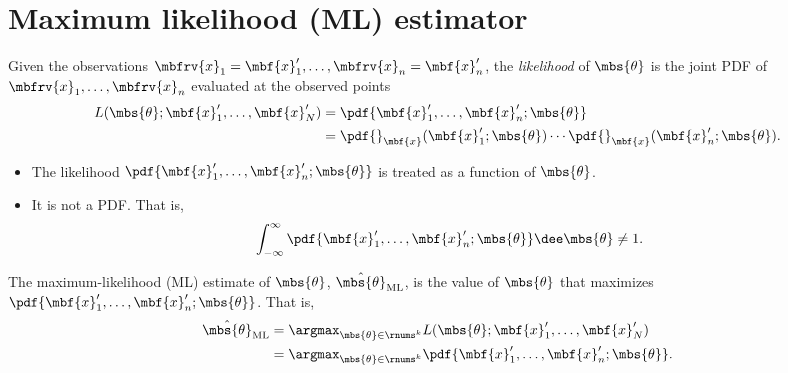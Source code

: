 \section{Maximum likelihood (ML) estimator}
\begin{mydefinition}[Likelihood]
    Given the observations $\mbfrv{x}_{1} = \mbf{x}_{1}', \ldots, \mbfrv{x}_{n}=\mbf{x}_{n}'$, the \emph{likelihood} of $\mbs{\theta}$ is the joint PDF of $\mbfrv{x}_{1},\ldots,\mbfrv{x}_{n}$ evaluated at the observed points
    \begin{align}
        L(\mbs{\theta}; \mbf{x}_{1}', \ldots, \mbf{x}_{N}') &=
        \pdf{\mbf{x}_{1}',\ldots, \mbf{x}_{n}';\mbs{\theta}}\\
         &= \pdf{}_{\mbf{x}}(\mbf{x}_{1}';\mbs{\theta})\cdots\pdf{}_{\mbf{x}}(\mbf{x}_{n}';\mbs{\theta}).
    \end{align}
\end{mydefinition}
\begin{myremark}
    \begin{itemize}
        \item The likelihood $\pdf{\mbf{x}_{1}',\ldots, \mbf{x}_{n}';\mbs{\theta}}$ is treated as a function of $\mbs{\theta}$.
        \item It is not a PDF. That is,
        \begin{align}
            \int_{-\infty}^{\infty}\pdf{\mbf{x}_{1}',\ldots, \mbf{x}_{n}';\mbs{\theta}}\dee\mbs{\theta}\neq 1.
        \end{align}
    \end{itemize}
\end{myremark}

\begin{mydefinition}
    The maximum-likelihood (ML) estimate of $\mbs{\theta}$, $\hat{\mbs{\theta}}_{\mathrm{ML}}$, is the value of $\mbs{\theta}$ that maximizes $\pdf{\mbf{x}_{1}',\ldots, \mbf{x}_{n}';\mbs{\theta}}$. That is,
    \begin{align}
        \hat{\mbs{\theta}}_{\mathrm{ML}} 
        &= \argmax_{\mbs{\theta}\in\rnums^{k}} L(\mbs{\theta}; \mbf{x}_{1}', \ldots, \mbf{x}_{N}')\\
        &= \argmax_{\mbs{\theta}\in\rnums^{k}} \pdf{\mbf{x}_{1}',\ldots, \mbf{x}_{n}';\mbs{\theta}}.
    \end{align}
\end{mydefinition}

